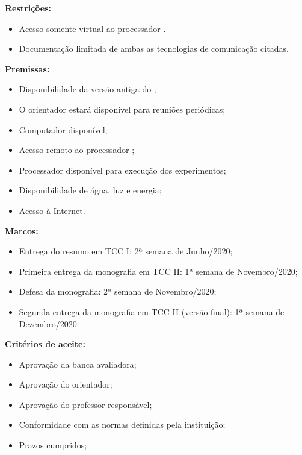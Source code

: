 \documentclass[
    12pt,               %
    openright,          %
    twoside,            %
    a4paper,            %
    english,            %
    brazil,             %
    ]{abntex2}
\begin{document}
\begin{flushleft}
      \textbf{Restrições:}
    \begin{itemize}
        \item Acesso somente virtual ao processador \mppa.
        \item Documentação limitada de ambas as tecnologias de comunicação citadas.
    \end{itemize}
        
    \textbf{Premissas:}
    \begin{itemize}
        \item Disponibilidade da versão antiga do \capb;
        \item O orientador estará disponível para reuniões periódicas;
        \item Computador disponível; 
        \item Acesso remoto ao processador \mppa; 
          \item Processador disponível para execução dos experimentos;
        \item Disponibilidade de água, luz e energia;
        \item Acesso à Internet.
    \end{itemize}
        
    \textbf{Marcos:}
    \begin{itemize}
        \item Entrega do resumo em TCC I: 2ª semana de Junho/2020; 
        \item Primeira entrega da monografia em TCC II: 1ª semana de Novembro/2020; 
        \item Defesa da monografia: 2ª semana de Novembro/2020;
        \item Segunda entrega da monografia em TCC II (versão final): 1ª semana de Dezembro/2020.
    \end{itemize}
        
    \textbf{Critérios de aceite:}
    \begin{itemize}
        \item Aprovação da banca avaliadora;
        \item Aprovação do orientador;
        \item Aprovação do professor responsável;
        \item Conformidade com as normas definidas pela instituição;
        \item Prazos cumpridos;
    \end{itemize}
\end{flushleft}
    
\end{document}
